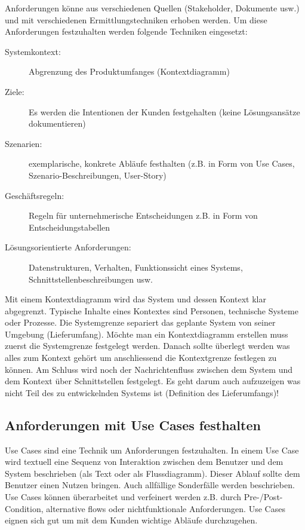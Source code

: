 Anforderungen könne aus verschiedenen Quellen (Stakeholder, Dokumente usw.) und mit verschiedenen Ermittlungstechniken erhoben werden. Um diese Anforderungen festzuhalten werden folgende Techniken eingesetzt:
\begin{description}
	\item[Systemkontext:] Abgrenzung des Produktumfanges (Kontextdiagramm)
	\item[Ziele:] Es werden die Intentionen der Kunden festgehalten (keine Lösungsansätze dokumentieren)
	\item[Szenarien:] exemplarische, konkrete Abläufe festhalten (z.B. in Form von Use Cases, Szenario-Beschreibungen, User-Story)
	\item[Geschäftsregeln:] Regeln für unternehmerische Entscheidungen z.B. in Form von Entscheidungstabellen
	\item[Lösungsorientierte Anforderungen:] Datenstrukturen, Verhalten, Funktionssicht eines Systems, Schnittstellenbeschreibungen usw.
\end{description}
Mit einem Kontextdiagramm wird das System und dessen Kontext klar abgegrenzt. Typische Inhalte eines Kontextes sind Personen, technische Systeme oder Prozesse. Die Systemgrenze separiert das geplante System von seiner Umgebung (Lieferumfang). Möchte man ein Kontextdiagramm erstellen muss zuerst die Systemgrenze festgelegt werden. Danach sollte überlegt werden was alles zum Kontext gehört um anschliessend die Kontextgrenze festlegen zu können. Am Schluss wird noch der Nachrichtenfluss zwischen dem System und dem Kontext über Schnittstellen festgelegt. Es geht darum auch aufzuzeigen was nicht Teil des zu entwickelnden Systems ist (Definition des Lieferumfangs)!

\subsection{Anforderungen mit Use Cases festhalten}

Use Cases sind eine Technik um Anforderungen festzuhalten. In einem Use Case wird textuell eine Sequenz von Interaktion zwischen dem Benutzer und dem System beschrieben (als Text oder als Flussdiagramm). Dieser Ablauf sollte dem Benutzer einen Nutzen bringen. Auch allfällige Sonderfälle werden beschrieben. Use Cases können überarbeitet und verfeinert werden z.B. durch Pre-/Post-Condition, alternative flows oder nichtfunktionale Anforderungen. Use Cases eignen sich gut um mit dem Kunden wichtige Abläufe durchzugehen.

